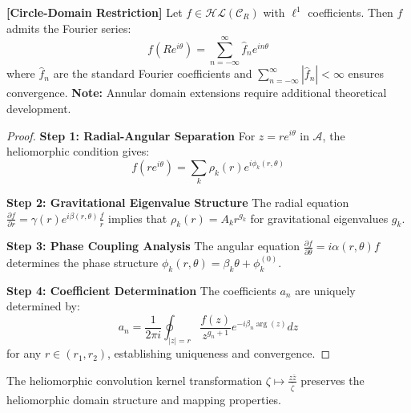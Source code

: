 \begin{theorem}
\label{thm:heliomorphic_fourier_series}
\textbf{[Circle-Domain Restriction]} Let $f \in \mathcal{HL}(\mathcal{C}_R)$ with $\ell^1$ coefficients. Then $f$ admits the Fourier series:
$$f(Re^{i\theta}) = \sum_{n=-\infty}^{\infty} \hat{f}_n e^{in\theta}$$
where $\hat{f}_n$ are the standard Fourier coefficients and $\sum_{n=-\infty}^{\infty} |\hat{f}_n| < \infty$ ensures convergence.
\textbf{Note:} Annular domain extensions require additional theoretical development.
\end{theorem}

\begin{proof}
\textbf{Step 1: Radial-Angular Separation}
For $z = re^{i\theta}$ in $\mathcal{A}$, the heliomorphic condition gives:
$$f(re^{i\theta}) = \sum_{k} \rho_k(r) e^{i\phi_k(r,\theta)}$$

\textbf{Step 2: Gravitational Eigenvalue Structure}
The radial equation $\frac{\partial f}{\partial r} = \gamma(r)e^{i\beta(r,\theta)}\frac{f}{r}$ implies that $\rho_k(r) = A_k r^{g_k}$ for gravitational eigenvalues $g_k$.

\textbf{Step 3: Phase Coupling Analysis}
The angular equation $\frac{\partial f}{\partial \theta} = i\alpha(r,\theta)f$ determines the phase structure $\phi_k(r,\theta) = \beta_k \theta + \phi_k^{(0)}$.

\textbf{Step 4: Coefficient Determination}
The coefficients $a_n$ are uniquely determined by:
$$a_n = \frac{1}{2\pi i} \oint_{|z|=r} \frac{f(z)}{z^{g_n+1}} e^{-i\beta_n \arg(z)} dz$$
for any $r \in (r_1, r_2)$, establishing uniqueness and convergence.
\end{proof}

\begin{theorem}
\label{thm:convolution_kernel_invariance}
The heliomorphic convolution kernel transformation $\zeta \mapsto \frac{z\bar{z}}{\bar{\zeta}}$ preserves the heliomorphic domain structure and mapping properties.
\end{theorem}

